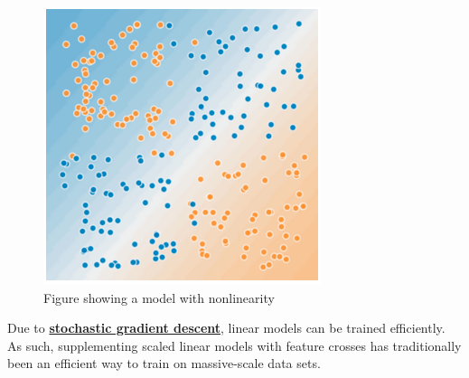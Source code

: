 \documentclass[12pt]{article}
\begin{document}
\begin{figure}[H]
	\includegraphics[scale = 0.5]{imgs/NonLinearModel.png}
	\centering
	\caption{Figure showing a model with nonlinearity}
\end{figure}

Due to \href{https://developers.google.com/machine-learning/crash-course/reducing-loss/stochastic-gradient-descent}{\textbf{stochastic gradient descent}}, linear models can be trained efficiently. As such, supplementing scaled linear models with feature crosses has traditionally been an efficient way to train on massive-scale data sets.
\end{document}
